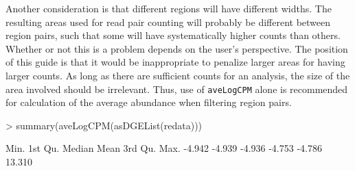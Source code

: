 \documentclass[12pt]{report}
\renewenvironment{Schunk}{\vspace{0pt}}{\vspace{0pt}}
\newcommand{\code}[1]{{\small\texttt{#1}}}
\begin{document}
Another consideration is that different regions will have different widths.
The resulting areas used for read pair counting will probably be different between region pairs, such that some will have systematically higher counts than others.
Whether or not this is a problem depends on the user's perspective.
The position of this guide is that it would be inappropriate to penalize larger areas for having larger counts. 
As long as there are sufficient counts for an analysis, the size of the area involved should be irrelevant.
Thus, use of \code{aveLogCPM} alone is recommended for calculation of the average abundance when filtering region pairs.


\begin{Schunk}
\begin{Sinput}
> summary(aveLogCPM(asDGEList(redata)))
\end{Sinput}
\begin{Soutput}
   Min. 1st Qu.  Median    Mean 3rd Qu.    Max. 
 -4.942  -4.939  -4.936  -4.753  -4.786  13.310 
\end{Soutput}
\end{Schunk}

%
%
%
%
\end{document}

